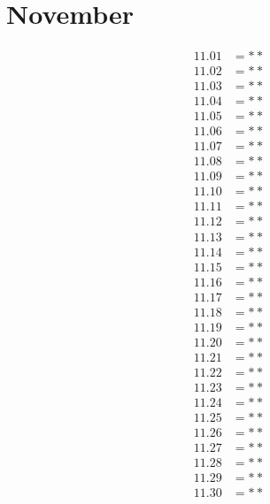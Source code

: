 \documentclass[12pt]{article}
\begin{document}
\section{November}
\begin{align*}
11.01 &= **\\
11.02 &= **\\
11.03 &= **\\
11.04 &= **\\
11.05 &= **\\
11.06 &= **\\
11.07 &= **\\
11.08 &= **\\
11.09 &= **\\
11.10 &= **\\
11.11 &= **\\
11.12 &= **\\
11.13 &= **\\
11.14 &= **\\
11.15 &= **\\
11.16 &= **\\
11.17 &= **\\
11.18 &= **\\
11.19 &= **\\
11.20 &= **\\
11.21 &= **\\
11.22 &= **\\
11.23 &= **\\
11.24 &= **\\
11.25 &= **\\
11.26 &= **\\
11.27 &= **\\
11.28 &= **\\
11.29 &= **\\
11.30 &= **\\
\end{align*}

\pagebreak
 
\end{document}
